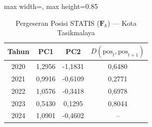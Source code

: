 \begin{table}[H]
\centering
\caption{Pergeseran Posisi STATIS ($\mathbf{F}_k$) --- Kota Tasikmalaya} \label{tab:app2jarak_statis_skor_kota_tasikmalaya}
\begin{adjustbox}{max width=\textwidth, max height=0.85\textheight}
\begin{tabular}{|c|c|c|c|}
\hline
\textbf{Tahun} & \textbf{PC1} & \textbf{PC2} & \textbf{$D(\text{pos}_t, \text{pos}_{t+1})$} \\
\hline
2020 & 1,2956 & -1,1831 & 0,6480 \\
2021 & 0,9916 & -0,6109 & 0,2771 \\
2022 & 1,0576 & -0,3418 & 0,6978 \\
2023 & 0,5430 & 0,1295 & 0,8044 \\
2024 & 1,0901 & -0,4602 & -- \\
\hline
\end{tabular}
\end{adjustbox}
\end{table}